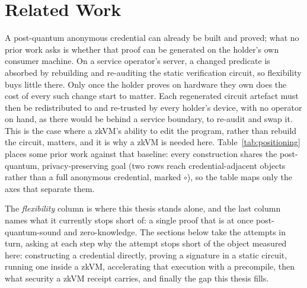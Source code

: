 \section{Related Work}\label{sec:related}
A post-quantum anonymous credential can already be built and proved; what no prior work asks is whether that proof can be generated on the holder's own consumer machine. On a service operator's server, a changed predicate is absorbed by rebuilding and re-auditing the static verification circuit, so flexibility buys little there. Only once the holder proves on hardware they own does the cost of every such change start to matter. Each regenerated circuit artefact must then be redistributed to and re-trusted by every holder's device, with no operator on hand, as there would be behind a service boundary, to re-audit and swap it. This is the case where a zkVM's ability to edit the program, rather than rebuild the circuit, matters, and it is why a zkVM is needed here. Table~\ref{tab:positioning} places some prior work against that baseline: every construction shares the post-quantum, privacy-preserving goal (two rows reach credential-adjacent objects rather than a full anonymous credential, marked $\circ$), so the table maps only the axes that separate them.

The \emph{flexibility} column is where this thesis stands alone, and the last column names what it currently stops short of: a single proof that is at once post-quantum-sound and zero-knowledge. The sections below take the attempts in turn, asking at each step why the attempt stops short of the object measured here: constructing a credential directly, proving a signature in a static circuit, running one inside a zkVM, accelerating that execution with a precompile, then what security a zkVM receipt carries, and finally the gap this thesis fills.

